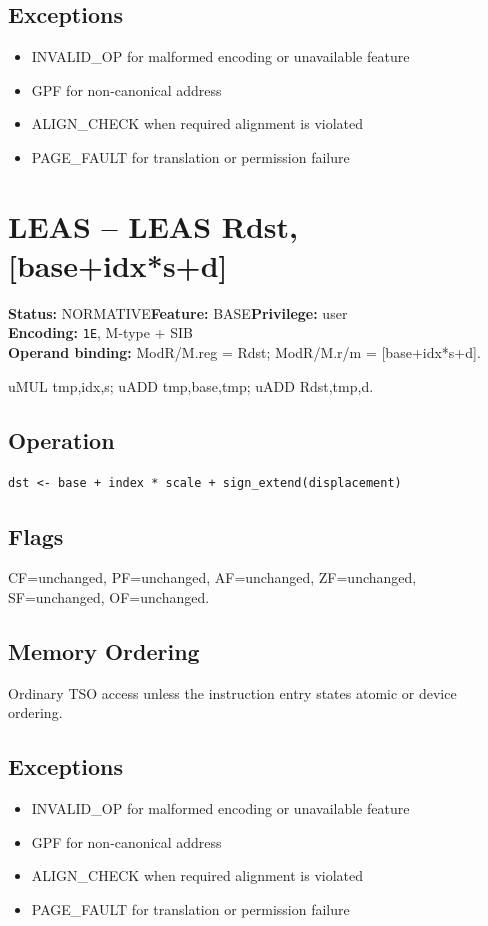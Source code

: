 \documentclass[10pt]{article}
\begin{document}
\subsection*{Exceptions}
\begin{itemize}
\item INVALID\_OP for malformed encoding or unavailable feature
\item GPF for non-canonical address
\item ALIGN\_CHECK when required alignment is violated
\item PAGE\_FAULT for translation or permission failure
\end{itemize}
\clearpage

\section{LEAS -- LEAS Rdst, [base+idx*s+d]}
\textbf{Status:} NORMATIVE\quad \textbf{Feature:} BASE\quad \textbf{Privilege:} user\\
\textbf{Encoding:} \texttt{1E}, M-type + SIB\\
\textbf{Operand binding:} ModR/M.reg = Rdst; ModR/M.r/m = [base+idx*s+d].

uMUL tmp,idx,s; uADD tmp,base,tmp; uADD Rdst,tmp,d.

\subsection*{Operation}
\begin{lstlisting}
dst <- base + index * scale + sign_extend(displacement)
\end{lstlisting}
\subsection*{Flags}
CF=unchanged, PF=unchanged, AF=unchanged, ZF=unchanged, SF=unchanged, OF=unchanged.
\subsection*{Memory Ordering}
Ordinary TSO access unless the instruction entry states atomic or device ordering.
\subsection*{Exceptions}
\begin{itemize}
\item INVALID\_OP for malformed encoding or unavailable feature
\item GPF for non-canonical address
\item ALIGN\_CHECK when required alignment is violated
\item PAGE\_FAULT for translation or permission failure
\end{itemize}
\clearpage
\end{document}
